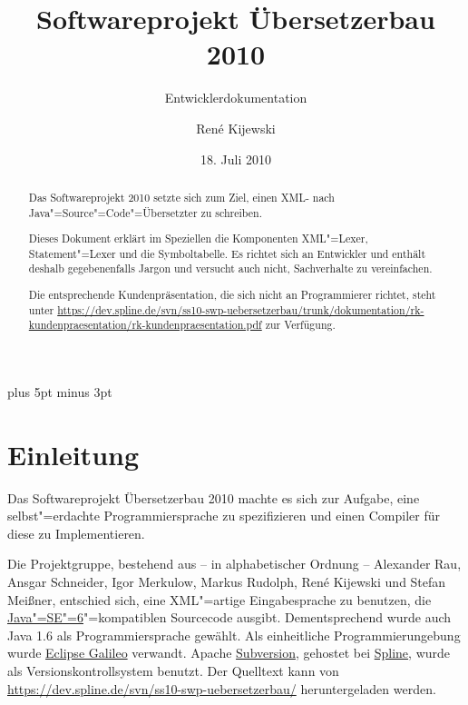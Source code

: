 \documentclass[10pt,a4paper,ngerman,titlepage,tocindentauto]{scrartcl}
\newcommand{\link}[1]{\href{#1}{#1}}
\begin{document}
	\begin{titlepage}
		\titlehead{\texttt{[image: graphiken/Fub-logo.pdf]}}
		\title{Softwareprojekt Übersetzerbau 2010} 
		\subtitle{Entwicklerdokumentation}
		\author{René Kijewski} 
		\date{18. Juli 2010 \vfill}
		\maketitle
	\end{titlepage}
	
	\begin{abstract}
		Das Softwareprojekt 2010 setzte sich zum Ziel, einen XML- nach Java"=Source"=Code"=Übersetzter
		zu schreiben.
		
		Dieses Dokument erklärt im Speziellen die Komponenten XML"=Lexer, Statement"=Lexer
		und die Symboltabelle. Es richtet sich an Entwickler und enthält deshalb gegebenenfalls
		Jargon und versucht auch nicht, Sachverhalte zu vereinfachen.
		
		Die entsprechende Kundenpräsentation, die sich nicht an Programmierer richtet, steht unter
		\link{https://dev.spline.de/svn/ss10-swp-uebersetzerbau/trunk/dokumentation/rk-kundenpraesentation/rk-kundenpraesentation.pdf}
		zur Verfügung.
	\end{abstract}

	{
		\pagestyle{empty}
		\tableofcontents
		\newpage
	}
	
	\parskip 7pt plus 5pt minus 3pt
	\setcounter{page}{1}
	\section{Einleitung}
		Das Softwareprojekt Übersetzerbau 2010 machte es sich zur Aufgabe, eine selbst"=erdachte Programmiersprache
		zu spezifizieren und einen Compiler für diese zu Implementieren.
		
		Die Projektgruppe, bestehend aus -- in alphabetischer Ordnung --
			Alexander Rau,
			Ansgar Schneider,
			Igor Merkulow,
			Markus Rudolph,
			René Kijewski und
			Stefan Meißner,
		entschied sich, eine XML"=artige Eingabesprache zu benutzen, die
		\href{http://java.sun.com/javase/6/}{Java"=SE"=6}"=kompatiblen Sourcecode ausgibt.
		Dementsprechend wurde auch Java 1.6 als Programmiersprache gewählt.
		Als einheitliche Programmierungebung wurde \href{http://www.eclipse.org/galileo/}{Eclipse Galileo} verwandt.
		Apache \href{http://subversion.apache.org/}{Subversion}, gehostet bei \href{http://dev.spline.de/}{Spline}, wurde als
		Versionskontrollsystem benutzt. Der Quelltext kann von \link{https://dev.spline.de/svn/ss10-swp-uebersetzerbau/}
		heruntergeladen werden.
		
\end{document}

